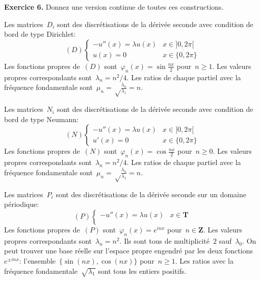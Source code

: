 {\color{blue}
{\bf Exercice 6.}
Donnez une version continue de toutes ces constructions.
}

Les matrices~$D_i$ sont des discrétisations de la dérivée seconde avec condition
de bord de type Dirichlet:
\[
	(D)
	\begin{cases}
		-u''(x) = \lambda u(x) & x\in]0,2\pi[ \\
		u(x) = 0 & x\in\{0,2\pi\}
	\end{cases}
\]
Les fonctions propres de~$(D)$ sont~$\varphi_n(x)=\sin\frac{nx}2$ pour~$n\ge
1$.  Les valeurs propres correspondants sont~$\lambda_n=n^2/4$.
Les ratios de
chaque partiel avec la fréquence fondamentale
sont~$\mu_n=\sqrt\frac{\lambda_n}{\lambda_1}=n$.

Les matrices~$N_i$ sont des discrétisations de la dérivée seconde avec
condition de bord de type Neumann:
\[
	(N)
	\begin{cases}
		-u''(x) = \lambda u(x) & x\in]0,2\pi[ \\
		u'(x) = 0 & x\in\{0,2\pi\}
	\end{cases}
\]
Les fonctions propres de~$(N)$ sont~$\varphi_n(x)=\cos\frac{nx}2$ pour~$n\ge
0$.  Les valeurs propres correspondants sont~$\lambda_n=n^2/4$.
Les ratios de
chaque partiel avec la fréquence fondamentale
sont~$\mu_n=\sqrt\frac{\lambda_n}{\lambda_1}=n$.

Les matrices~$P_i$ sont des discrétisations de la dérivée seconde sur un
domaine périodique:
\[
	(P)
	\begin{cases}
		-u''(x) = \lambda u(x) & x\in\mathbf{T} \\
	\end{cases}
\]
Les fonctions propres de~$(P)$ sont~$\varphi_n(x)=e^{inx}$
pour~$n\in\mathbf{Z}$.  Les valeurs propres correspondants
sont~$\lambda_n=n^2$.  Ils sont tous de multiplicité~$2$ sauf~$\lambda_0$.  On
peut trouver une base réelle sur l'espace propre engendré par les deux
fonctions~$e^{\pm inx}$: l'ensemble~$\{\sin(nx), \cos(nx)\}$ pour~$n\ge 1$.
Les ratios avec la fréquence fondamentale~$\sqrt{\lambda_1}$ sont tous les
entiers positifs.





